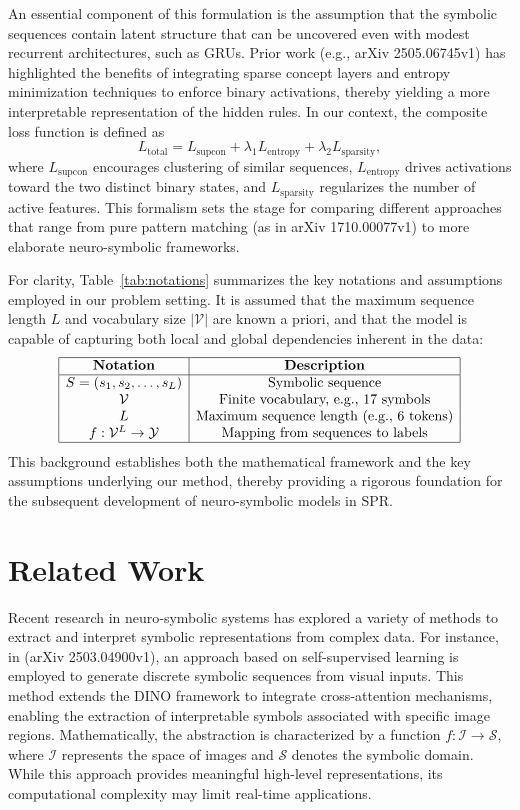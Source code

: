 \documentclass[12pt]{article}
\begin{document}
An essential component of this formulation is the assumption that the symbolic sequences contain latent structure that can be uncovered even with modest recurrent architectures, such as GRUs. Prior work (e.g., arXiv 2505.06745v1) has highlighted the benefits of integrating sparse concept layers and entropy minimization techniques to enforce binary activations, thereby yielding a more interpretable representation of the hidden rules. In our context, the composite loss function is defined as
\[
L_{\text{total}} = L_{\text{supcon}} + \lambda_1 L_{\text{entropy}} + \lambda_2 L_{\text{sparsity}},
\]
where \( L_{\text{supcon}} \) encourages clustering of similar sequences, \( L_{\text{entropy}} \) drives activations toward the two distinct binary states, and \( L_{\text{sparsity}} \) regularizes the number of active features. This formalism sets the stage for comparing different approaches that range from pure pattern matching (as in arXiv 1710.00077v1) to more elaborate neuro-symbolic frameworks.

For clarity, Table~\ref{tab:notations} summarizes the key notations and assumptions employed in our problem setting. It is assumed that the maximum sequence length \( L \) and vocabulary size \( |\mathcal{V}| \) are known a priori, and that the model is capable of capturing both local and global dependencies inherent in the data:
\[
\begin{array}{|c|c|}
\hline
\textbf{Notation} & \textbf{Description} \\
\hline
S = (s_1, s_2, \dots, s_L) & \text{Symbolic sequence} \\
\mathcal{V} & \text{Finite vocabulary, e.g., } 17 \text{ symbols} \\
L & \text{Maximum sequence length (e.g., } 6 \text{ tokens)} \\
f: \mathcal{V}^L \rightarrow \mathcal{Y} & \text{Mapping from sequences to labels} \\
\hline
\end{array}
\]
This background establishes both the mathematical framework and the key assumptions underlying our method, thereby providing a rigorous foundation for the subsequent development of neuro-symbolic models in SPR.

\section{Related Work}
Recent research in neuro‐symbolic systems has explored a variety of methods to extract and interpret symbolic representations from complex data. For instance, in (arXiv 2503.04900v1), an approach based on self-supervised learning is employed to generate discrete symbolic sequences from visual inputs. This method extends the DINO framework to integrate cross-attention mechanisms, enabling the extraction of interpretable symbols associated with specific image regions. Mathematically, the abstraction is characterized by a function \( f: \mathcal{I} \rightarrow \mathcal{S} \), where \( \mathcal{I} \) represents the space of images and \( \mathcal{S} \) denotes the symbolic domain. While this approach provides meaningful high-level representations, its computational complexity may limit real-time applications.
\end{document}
